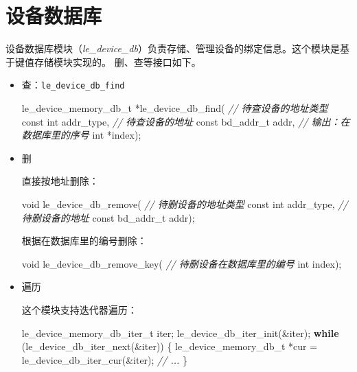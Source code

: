 \documentclass[
  12pt,
]{book}
\newenvironment{Shaded}{\begin{snugshade}}{\end{snugshade}}
\newcommand{\CommentTok}[1]{\textcolor[rgb]{0.56,0.35,0.01}{\textit{#1}}}
\newcommand{\ControlFlowTok}[1]{\textcolor[rgb]{0.13,0.29,0.53}{\textbf{#1}}}
\newcommand{\DataTypeTok}[1]{\textcolor[rgb]{0.13,0.29,0.53}{#1}}
\newcommand{\NormalTok}[1]{#1}
\begin{document}
\hypertarget{ch98-le-dev-db}{%
\section{设备数据库}\label{ch98-le-dev-db}}

设备数据库模块（\emph{le\_device\_db}）负责存储、管理设备的绑定信息。这个模块是基于键值存储模块实现的。
删、查等接口如下。

\begin{itemize}
\item
  查：\texttt{le\_device\_db\_find}

\begin{Shaded}
\begin{Highlighting}[]
\NormalTok{le_device_memory_db_t *le_device_db_find(}
  \CommentTok{// 待查设备的地址类型}
  \DataTypeTok{const} \DataTypeTok{int}\NormalTok{ addr_type,}
  \CommentTok{// 待查设备的地址}
  \DataTypeTok{const}\NormalTok{ bd_addr_t addr,}
  \CommentTok{// 输出：在数据库里的序号}
  \DataTypeTok{int}\NormalTok{ *index);}
\end{Highlighting}
\end{Shaded}
\item
  删

  直接按地址删除：

\begin{Shaded}
\begin{Highlighting}[]
\DataTypeTok{void}\NormalTok{ le_device_db_remove(}
  \CommentTok{// 待删设备的地址类型}
  \DataTypeTok{const} \DataTypeTok{int}\NormalTok{ addr_type,}
  \CommentTok{// 待删设备的地址}
  \DataTypeTok{const}\NormalTok{ bd_addr_t addr);}
\end{Highlighting}
\end{Shaded}

  根据在数据库里的编号删除：

\begin{Shaded}
\begin{Highlighting}[]
\DataTypeTok{void}\NormalTok{ le_device_db_remove_key(}
  \CommentTok{// 待删设备在数据库里的编号}
  \DataTypeTok{int}\NormalTok{ index);}
\end{Highlighting}
\end{Shaded}
\item
  遍历

  这个模块支持迭代器遍历：

\begin{Shaded}
\begin{Highlighting}[]
\NormalTok{le_device_memory_db_iter_t iter;}
\NormalTok{le_device_db_iter_init(&iter);}
\ControlFlowTok{while}\NormalTok{ (le_device_db_iter_next(&iter))}
\NormalTok{\{}
\NormalTok{    le_device_memory_db_t *cur = le_device_db_iter_cur(&iter);}
    \CommentTok{// ...}
\NormalTok{\}}
\end{Highlighting}
\end{Shaded}
\end{itemize}
\end{document}
